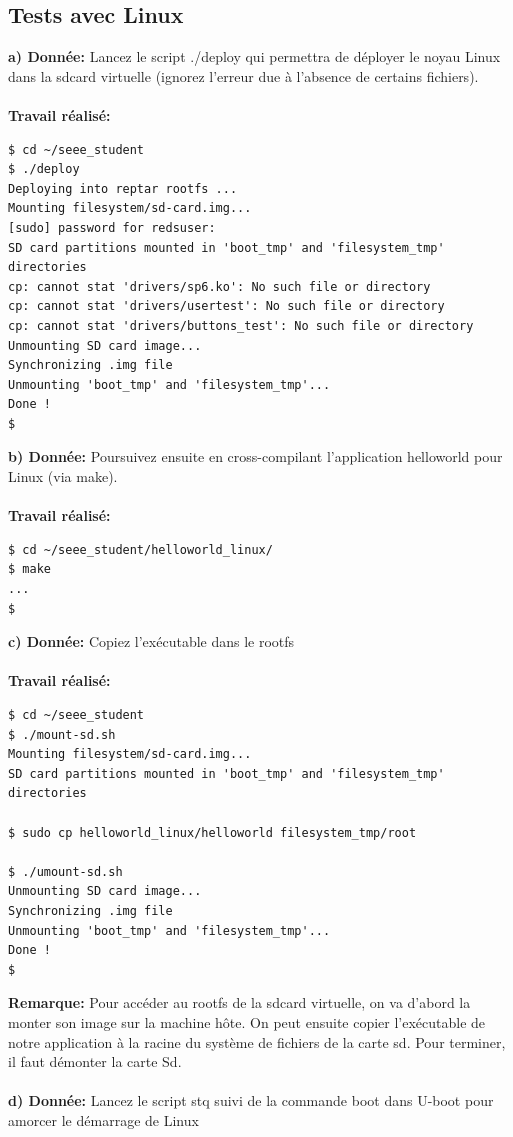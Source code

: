 \subsection{Tests avec Linux}
\textbf{a) Donnée: }Lancez le script ./deploy qui permettra de déployer le noyau Linux dans la sdcard virtuelle (ignorez
l'erreur due à l'absence de certains fichiers). \\\\
\textbf{Travail réalisé: }
\begin{lstlisting}
$ cd ~/seee_student
$ ./deploy 
Deploying into reptar rootfs ...
Mounting filesystem/sd-card.img...
[sudo] password for redsuser: 
SD card partitions mounted in 'boot_tmp' and 'filesystem_tmp' directories
cp: cannot stat 'drivers/sp6.ko': No such file or directory
cp: cannot stat 'drivers/usertest': No such file or directory
cp: cannot stat 'drivers/buttons_test': No such file or directory
Unmounting SD card image...
Synchronizing .img file
Unmounting 'boot_tmp' and 'filesystem_tmp'...
Done !
$ 
\end{lstlisting}
\textbf{b) Donnée: }Poursuivez ensuite en cross-compilant l'application helloworld pour Linux (via make). \\\\
\textbf{Travail réalisé: }
\begin{lstlisting}
$ cd ~/seee_student/helloworld_linux/
$ make
...
$
\end{lstlisting}
\textbf{c) Donnée: }Copiez l'exécutable dans le rootfs\\\\
\textbf{Travail réalisé: }
\begin{lstlisting}
$ cd ~/seee_student
$ ./mount-sd.sh 
Mounting filesystem/sd-card.img...
SD card partitions mounted in 'boot_tmp' and 'filesystem_tmp' directories

$ sudo cp helloworld_linux/helloworld filesystem_tmp/root

$ ./umount-sd.sh 
Unmounting SD card image...
Synchronizing .img file
Unmounting 'boot_tmp' and 'filesystem_tmp'...
Done !
$ 
\end{lstlisting}
\textbf{Remarque: } Pour accéder au rootfs de la sdcard virtuelle, on va d'abord la monter son image sur la machine hôte. On peut ensuite copier l'exécutable de notre application à la racine du système de fichiers de la carte sd. Pour terminer, il faut démonter la carte Sd.\\\\
\textbf{d) Donnée: }Lancez le script stq suivi de la commande boot dans U-boot pour amorcer le démarrage de Linux\\\\
